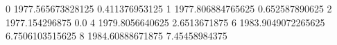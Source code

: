 0 1977.565673828125 0.411376953125
1 1977.806884765625 0.652587890625
2 1977.154296875 0.0
4 1979.8056640625 2.6513671875
6 1983.9049072265625 6.7506103515625
8 1984.60888671875 7.45458984375
